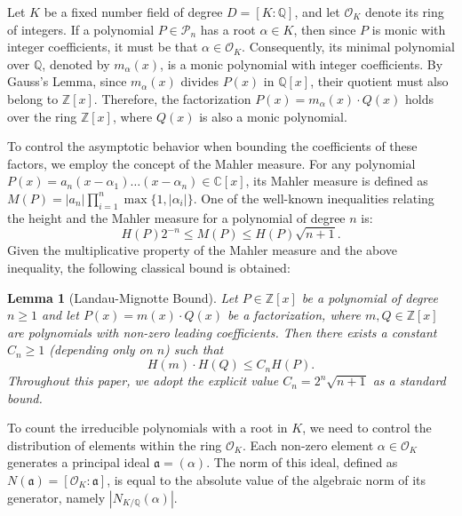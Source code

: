 \documentclass[11pt,a4paper]{article}
\newtheorem{lemma}[theorem]{Lemma}
\newcommand{\Q}{\mathbb{Q}}
\newcommand{\Z}{\mathbb{Z}}
\newcommand{\C}{\mathbb{C}}
\newcommand{\OK}{\mathcal{O}_K}
\begin{document}
Let $K$ be a fixed number field of degree $D = [K:\Q]$, and let $\OK$ denote its ring of integers. If a polynomial $P \in \mathcal{P}_n$ has a root $\alpha \in K$, then since $P$ is monic with integer coefficients, it must be that $\alpha \in \OK$. Consequently, its minimal polynomial over $\Q$, denoted by $m_\alpha(x)$, is a monic polynomial with integer coefficients. By Gauss's Lemma, since $m_\alpha(x)$ divides $P(x)$ in $\Q[x]$, their quotient must also belong to $\Z[x]$. Therefore, the factorization $P(x) = m_\alpha(x) \cdot Q(x)$ holds over the ring $\Z[x]$, where $Q(x)$ is also a monic polynomial.

To control the asymptotic behavior when bounding the coefficients of these factors, we employ the concept of the Mahler measure. For any polynomial $P(x) = a_n(x - \alpha_1) \dots (x - \alpha_n) \in \C[x]$, its Mahler measure is defined as $M(P) = |a_n| \prod_{i=1}^n \max\{1, |\alpha_i|\}$. One of the well-known inequalities relating the height and the Mahler measure for a polynomial of degree $n$ is:
\begin{equation*}
    H(P) 2^{-n} \le M(P) \le H(P)\sqrt{n+1}.
\end{equation*}
Given the multiplicative property of the Mahler measure and the above inequality, the following classical bound is obtained:

\begin{lemma}[Landau-Mignotte Bound]\label{lem:landau}
Let $P \in \Z[x]$ be a polynomial of degree $n \ge 1$ and let $P(x) = m(x) \cdot Q(x)$ be a factorization, where $m, Q \in \Z[x]$ are polynomials with non-zero leading coefficients. Then there exists a constant $C_n \ge 1$ (depending only on $n$) such that
\begin{equation*}
    H(m) \cdot H(Q) \le C_n H(P).
\end{equation*}
Throughout this paper, we adopt the explicit value $C_n = 2^n \sqrt{n+1}$ as a standard bound.
\end{lemma}

To count the irreducible polynomials with a root in $K$, we need to control the distribution of elements within the ring $\OK$. Each non-zero element $\alpha \in \OK$ generates a principal ideal $\mathfrak{a} = (\alpha)$. The norm of this ideal, defined as $N(\mathfrak{a}) = [\OK : \mathfrak{a}]$, is equal to the absolute value of the algebraic norm of its generator, namely $|N_{K/\Q}(\alpha)|$.
\end{document}
